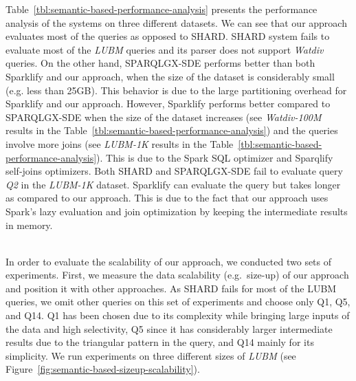 Table~\ref{tbl:semantic-based-performance-analysis} presents the performance analysis of the systems on three different datasets.
We can see that our approach evaluates most of the queries as opposed to SHARD.
SHARD system fails to evaluate most of the \textit{LUBM} queries and its parser does not support \textit{Watdiv} queries.
On the other hand, SPARQLGX-SDE performs better than both Sparklify and our approach, when the size of the dataset is considerably small (e.g. less than 25GB).
This behavior is due to the large partitioning overhead for Sparklify and our approach.
However, Sparklify performs better compared to SPARQLGX-SDE when the size of the dataset increases (see \textit{Watdiv-100M} results in the Table~\ref{tbl:semantic-based-performance-analysis}) and the queries involve more joins (see \textit{LUBM-1K} results in the Table~\ref{tbl:semantic-based-performance-analysis}).
This is due to the Spark SQL optimizer and Sparqlify self-joins optimizers.
Both SHARD and SPARQLGX-SDE fail to evaluate query \textit{Q2} in the \textit{LUBM-1K} dataset. 
Sparklify can evaluate the query but takes longer as compared to our approach.
This is due to the fact that our approach uses Spark's lazy evaluation and join optimization by keeping the intermediate results in memory.

~\\
In order to evaluate the scalability of our approach, we conducted two sets of experiments.
First, we measure the data scalability (e.g.\ size-up) of our approach and position it with other approaches.
As SHARD fails for most of the LUBM queries, we omit other queries on this set of experiments and choose only Q1, Q5, and Q14.
Q1 has been chosen due to its complexity while bringing large inputs of the data and high selectivity, Q5 since it has considerably larger intermediate results due to the triangular pattern in the query, and Q14 mainly for its simplicity.
We run experiments on three different sizes of \textit{LUBM} (see Figure~\ref{fig:semantic-based-sizeup-scalability}).

